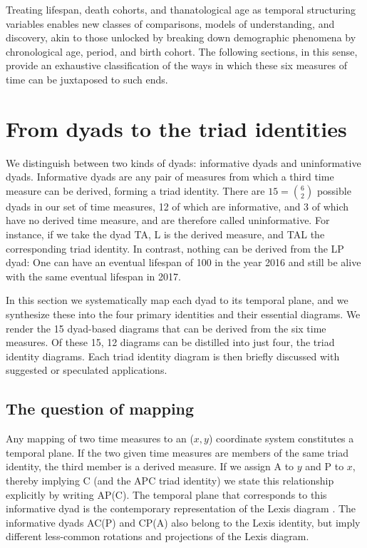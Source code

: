 \documentclass[12pt,oneside,a4paper]{article} %
\theoremstyle{definition}
\begin{document}
Treating lifespan,
death cohorts, and thanatological age as temporal structuring variables
enables new classes of comparisons, models of understanding, and discovery,
akin to those unlocked by breaking down demographic phenomena by chronological age,
period, and birth cohort. The following sections, in this sense, provide an
exhaustive classification of the ways in which these six measures of time can be juxtaposed to such ends.


\section{From dyads to the triad identities}
\label{sec:dyads2diagrams}
We distinguish between two kinds of dyads: informative dyads and uninformative dyads. Informative dyads are any pair of measures from which a third time measure
can be derived, forming a triad identity. There are
$15=\binom{6}{2}$ possible dyads in our set of time measures, 12 of which are
informative, and 3 of which have no derived time measure, and are therefore
called uninformative. For instance, if we take the dyad TA, L is the derived
measure, and TAL the corresponding triad identity. In
contrast, nothing can be derived from the LP dyad: One can have an eventual
lifespan of 100 in the year 2016 and still be alive with the same eventual lifespan in 2017.

In this section we systematically map each dyad to its temporal plane, and we
synthesize these into the four primary identities and their essential diagrams.
We render the 15 dyad-based diagrams that can be derived from the six time
measures. Of these 15, 12 diagrams can be distilled into just four, the triad identity diagrams. Each triad identity diagram is then briefly discussed with suggested or speculated
applications.

\subsection{The question of mapping}
Any mapping of two time measures to an ($x,y$) coordinate
system constitutes a temporal plane. If the two given time measures are members of the same triad identity, the third member is a derived
measure. If we assign A to $y$ and P to $x$, thereby implying C (and the APC
triad identity) we state this relationship explicitly by writing
AP(C).
The temporal plane that corresponds to this informative dyad is the contemporary representation of the
Lexis diagram \citep{lexis1875einleitung, pressat1961analyse}. The informative
dyads AC(P) and CP(A) also belong to the Lexis identity, but imply different
less-common rotations and projections of the Lexis diagram.
\end{document}
